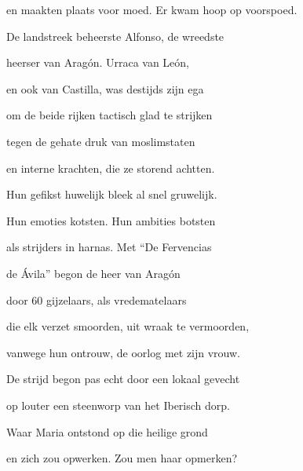 en maakten plaats voor moed.
Er kwam hoop op voorspoed.

De landstreek beheerste
Alfonso, de wreedste

heerser van Aragón.
Urraca van León,

en ook van Castilla,
was destijds zijn ega

om de beide rijken
tactisch glad te strijken

tegen de gehate
druk van moslimstaten

en interne krachten,
die ze storend achtten.

Hun gefikst huwelijk
bleek al snel gruwelijk.

Hun emoties kotsten.
Hun ambities botsten

als strijders in harnas.
Met “De Fervencias

de Ávila” begon
de heer van Aragón

door 60 gijzelaars,
als vredematelaars

die elk verzet smoorden,
uit wraak te vermoorden,

vanwege hun ontrouw,
de oorlog met zijn vrouw.

De strijd begon pas echt
door een lokaal gevecht

op louter een steenworp
van het Iberisch dorp.

Waar Maria ontstond
op die heilige grond

en zich zou opwerken.
Zou men haar opmerken?
